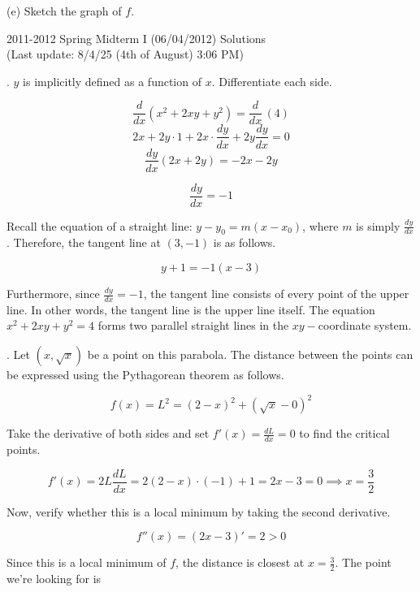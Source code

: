 \documentclass{article}
\begin{document}
\hfill

(e) Sketch the graph of $f$.

\newpage

\begin{center}
2011-2012 Spring Midterm I (06/04/2012) Solutions\\
(Last update: 8/4/25 (4th of August) 3:06 PM)
\end{center}

. $y$ is implicitly defined as a function of $x$. Differentiate each side.

\[\frac{d}{dx}\left(x^2+2xy+y^2\right)=\frac{d}{dx}\,(4)\]
\[2x+2y\cdot1+2x\cdot\frac{dy}{dx}+2y\frac{dy}{dx}=0\]
\[\frac{dy}{dx}(2x+2y)=-2x-2y\]

\[\frac{dy}{dx}=-1\]

\hfill

\noindent Recall the equation of a straight line: $y-y_0=m(x-x_0)$, where $m$ is simply $\displaystyle \frac{dy}{dx}$. Therefore, the tangent line at $(3,-1)$ is as follows.

\[\boxed{y+1=-1(x-3)}\]

\hfill

\noindent Furthermore, since $\displaystyle \frac{dy}{dx}=-1$, the tangent line consists of every point of the upper line. In other words, the tangent line is the upper line itself. The equation $x^2+2xy+y^2=4$ forms two parallel straight lines in the $xy-$coordinate system.

\hfill

. Let $(x,\sqrt x)$ be a point on this parabola. The distance between the points can be expressed using the Pythagorean theorem as follows.

\[f(x)=L^2=(2-x)^2 + (\sqrt x - 0)^2\]

\hfill

\noindent Take the derivative of both sides and set $\displaystyle f'(x)=\frac{dL}{dx} = 0$ to find the critical points.

\begin{equation*}
f'(x)=2L\frac{dL}{dx}=2(2-x)\cdot(-1) + 1 = 2x-3=0 \implies x=\frac{3}2
\end{equation*}

\hfill

\noindent Now, verify whether this is a local minimum by taking the second derivative.

\[f''(x)=(2x-3)'=2>0\]

\noindent Since this is a local minimum of $f$, the distance is closest at $\displaystyle x=\frac32$. The point we're looking for is
\end{document}
